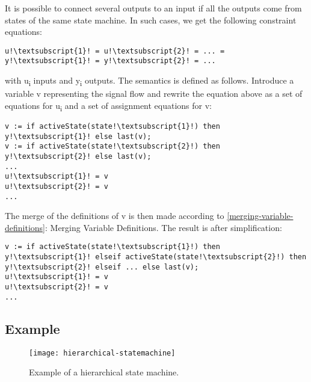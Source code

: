 It is possible to connect several outputs to an input if all the outputs
come from states of the same state machine. In such cases, we get the
following constraint equations:
\begin{lstlisting}[language=modelica,escapechar=!]
u!\textsubscript{1}! = u!\textsubscript{2}! = ... = y!\textsubscript{1}! = y!\textsubscript{2}! = ...
\end{lstlisting}
with u\textsubscript{i} inputs and y\textsubscript{i} outputs. The
semantics is defined as follows. Introduce a variable v representing the
signal flow and rewrite the equation above as a set of equations for
u\textsubscript{i} and a set of assignment equations for v:
\begin{lstlisting}[language=modelica,escapechar=!]
v := if activeState(state!\textsubscript{1}!) then y!\textsubscript{1}! else last(v);
v := if activeState(state!\textsubscript{2}!) then y!\textsubscript{2}! else last(v);
...
u!\textsubscript{1}! = v
u!\textsubscript{2}! = v
...
\end{lstlisting}

The merge of the definitions of v is then made according to \cref{merging-variable-definitions}:
Merging Variable Definitions. The result is after
simplification:
\begin{lstlisting}[language=modelica,escapechar=!]
v := if activeState(state!\textsubscript{1}!) then y!\textsubscript{1}! elseif activeState(state!\textsubscript{2}!) then y!\textsubscript{2}! elseif ... else last(v);
u!\textsubscript{1}! = v
u!\textsubscript{2}! = v
...
\end{lstlisting}

\subsection{Example}\label{example}

\begin{figure}[H]
  \begin{center}
    \texttt{[image: hierarchical-statemachine]}
  \end{center}
  \caption{Example of a hierarchical state machine.}
  \label{fig:hierarchical-statemachine}
\end{figure}


